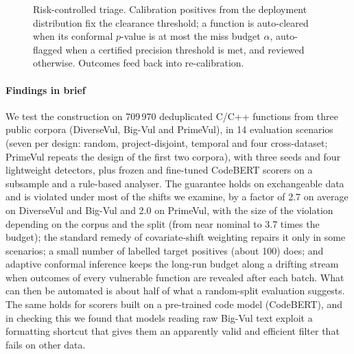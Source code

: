 \begin{figure}[t]
\centering
\resizebox{\linewidth}{!}{}
\caption{Risk-controlled triage. Calibration positives from the deployment distribution fix the clearance threshold; a function is auto-cleared when its conformal $p$-value is at most the miss budget $\alpha$, auto-flagged when a certified precision threshold is met, and reviewed otherwise. Outcomes feed back into re-calibration.}\label{fig:framework}
\end{figure}

\paragraph{Findings in brief} We test the construction on 709\,970 deduplicated C/C++ functions from three public corpora (DiverseVul, Big-Vul and PrimeVul), in 14 evaluation scenarios (seven per design: random, project-disjoint, temporal and four cross-dataset; PrimeVul repeats the design of the first two corpora), with three seeds and four lightweight detectors, plus frozen and fine-tuned CodeBERT scorers on a subsample and a rule-based analyser. The guarantee holds on exchangeable data and is violated under most of the shifts we examine, by a factor of 2.7 on average on DiverseVul and Big-Vul and 2.0 on PrimeVul, with the size of the violation depending on the corpus and the split (from near nominal to 3.7 times the budget); the standard remedy of covariate-shift weighting repairs it only in some scenarios; a small number of labelled target positives (about 100) does; and adaptive conformal inference keeps the long-run budget along a drifting stream when outcomes of every vulnerable function are revealed after each batch. What can then be automated is about half of what a random-split evaluation suggests. The same holds for scorers built on a pre-trained code model (CodeBERT), and in checking this we found that models reading raw Big-Vul text exploit a formatting shortcut that gives them an apparently valid and efficient filter that fails on other data.

